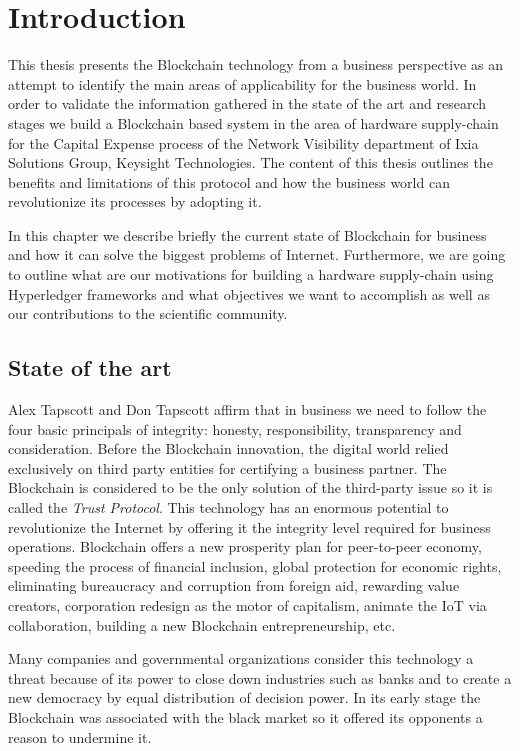 \chapter{Introduction}
\label{chapter:intro}

This thesis presents the Blockchain technology from a business perspective as an attempt to identify the main areas of applicability for the business world.
In order to validate the information gathered in the state of the art and research stages we build a Blockchain based system in the area of hardware supply-chain for the Capital Expense process of the Network Visibility department of Ixia Solutions Group, Keysight Technologies. The content of this thesis outlines the benefits and limitations of this protocol and how the business world can revolutionize its processes by adopting it.

In this chapter we describe briefly the current state of Blockchain for business and how it can solve the biggest problems of Internet. Furthermore, we are going to outline what are our motivations for building a hardware supply-chain using Hyperledger frameworks and what objectives we want to accomplish as well as our contributions to the scientific community.

\section{State of the art}
\label{sec:intro-section1}
Alex Tapscott and Don Tapscott \cite{tapscott} affirm that in business we need to follow the four basic principals of integrity: honesty, responsibility, transparency and consideration. Before the Blockchain innovation, the digital world relied exclusively on third party entities for certifying a business partner. The Blockchain is considered to be the only solution of the third-party issue so it is called the \emph{Trust Protocol}. This technology has an enormous potential to revolutionize the Internet by offering it the integrity level required for business operations.
Blockchain offers a new prosperity plan for peer-to-peer economy, speeding the process of financial inclusion, global protection for economic rights, eliminating bureaucracy and corruption from foreign aid, rewarding value creators, corporation redesign as the motor of capitalism, animate the IoT via collaboration, building a new Blockchain entrepreneurship, etc.

Many companies and governmental organizations consider this technology a threat because of its power to close down industries such as banks and to create a new democracy by equal distribution of decision power. In its early stage the Blockchain was associated with the black market so it offered its opponents a reason to undermine it.

